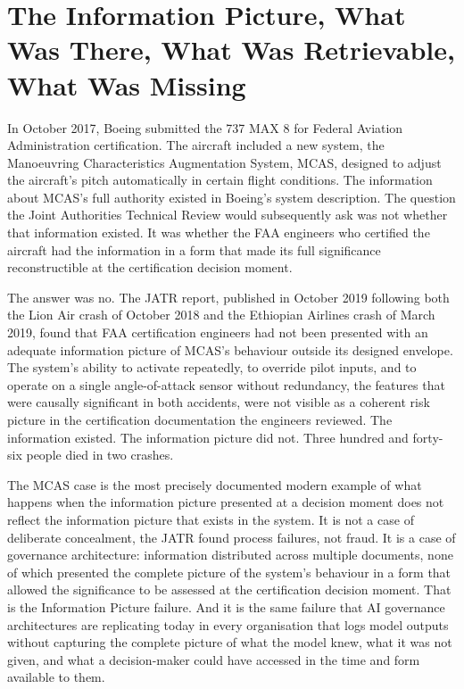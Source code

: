 
\chapter{The Information Picture, What Was There, What Was Retrievable, What Was Missing}

In October 2017, Boeing submitted the 737 MAX 8 for Federal Aviation Administration certification. The aircraft included a new system, the Manoeuvring Characteristics Augmentation System, MCAS, designed to adjust the aircraft's pitch automatically in certain flight conditions. The information about MCAS's full authority existed in Boeing's system description. The question the Joint Authorities Technical Review would subsequently ask was not whether that information existed. It was whether the FAA engineers who certified the aircraft had the information in a form that made its full significance reconstructible at the certification decision moment.

The answer was no. The JATR report, published in October 2019 following both the Lion Air crash of October 2018 and the Ethiopian Airlines crash of March 2019, found that FAA certification engineers had not been presented with an adequate information picture of MCAS's behaviour outside its designed envelope. The system's ability to activate repeatedly, to override pilot inputs, and to operate on a single angle-of-attack sensor without redundancy, the features that were causally significant in both accidents, were not visible as a coherent risk picture in the certification documentation the engineers reviewed. The information existed. The information picture did not. Three hundred and forty-six people died in two crashes.

The MCAS case is the most precisely documented modern example of what happens when the information picture presented at a decision moment does not reflect the information picture that exists in the system. It is not a case of deliberate concealment, the JATR found process failures, not fraud. It is a case of governance architecture: information distributed across multiple documents, none of which presented the complete picture of the system's behaviour in a form that allowed the significance to be assessed at the certification decision moment. That is the Information Picture failure. And it is the same failure that AI governance architectures are replicating today in every organisation that logs model outputs without capturing the complete picture of what the model knew, what it was not given, and what a decision-maker could have accessed in the time and form available to them.

